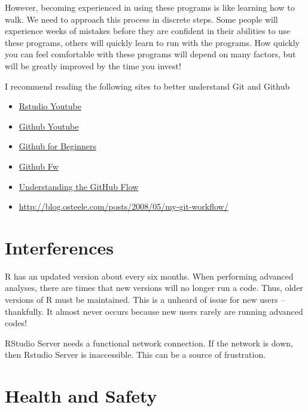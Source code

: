 \documentclass[12pt]{../SOP4_alpha}\usepackage[]{graphicx}\usepackage[]{color}
\begin{document}
\NP However, becoming experienced in using these programs is like learning how to walk. We need to approach this process in discrete steps. Some people will experience weeks of mistakes before they are confident in their abilities to use these programs, others will quickly learn to run with the programs. How quickly you can feel comfortable with these programs will depend on many factors, but will be greatly improved by the time you invest!

\NP I recommend reading the following sites to better understand Git and Github

\begin{itemize}
  \item \href{https://www.youtube.com/watch?v=uHYcDQDbMY8}{Rstudio Youtube}
  \item \href{https://www.youtube.com/watch?v=0fKg7e37bQE}{Github Youtube}
  \item \href{http://product.hubspot.com/blog/git-and-github-tutorial-for-beginners}{Github for Beginners}
  \item \href{http://scottchacon.com/2011/08/31/github-flow.html}{Github Fw}
  \item \href{https://guides.github.com/introduction/flow/}{Understanding the GitHub Flow}
  \item \href{http://blog.osteele.com/posts/2008/05/my-git-workflow/}{http://blog.osteele.com/posts/2008/05/my-git-workflow/}
  
\end{itemize}


\section{Interferences}

\NP R has an updated version about every six months. When performing advanced analyses, there are times that new versions will no longer run a code. Thus, older versions of R must be maintained. This is a unheard of issue for new users -- thankfully. It almost never occurs because new users rarely are running advanced codes!

\NP RStudio Server needs a functional network connection. If the network is down, then Rstudio Server is inaccessible. This can be a source of frustration. 

\section{Health and Safety}
\end{document}
